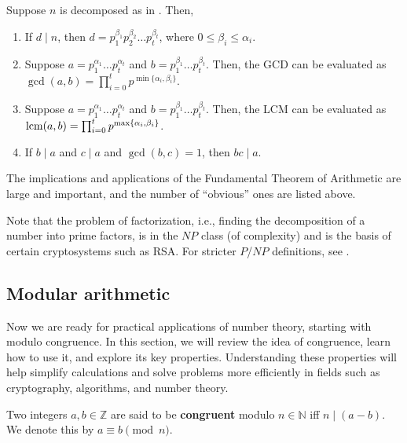 \documentclass[../lecture-notes-148x210.tex]{subfiles}
\begin{document}
\begin{corollary}
    Suppose $n$ is decomposed as in . Then,

    \begin{enumerate}
        \item If $d \mid n$, then $d = p_{1}^{\beta_1}p_{2}^{\beta_2} \dots p_{t}^{\beta_t}$, where $0 \leq \beta_i \leq \alpha_i$.
        \item Suppose $a = p_{1}^{\alpha_1} \dots p_{t}^{\alpha_t}$ and $b = p_{1}^{\beta_1} \dots p_{t}^{\beta_t}$. Then, the GCD can be evaluated as $\gcd(a, b) = \prod_{i=0}^{t}p^{\min\{\alpha_i, \beta_i\}}$.
        \item Suppose $a = p_{1}^{\alpha_1} \dots p_{t}^{\alpha_t}$ and $b = p_{1}^{\beta_1} \dots p_{t}^{\beta_t}$. Then, the LCM can be evaluated as $\text{lcm}(a, b) = \prod_{i=0}^{t}p^{\max\{\alpha_i, \beta_i\}}$.
        \item If $b \mid a$ and $c \mid a$ and $\gcd(b, c) = 1$, then $bc \mid a$.
    \end{enumerate}
\end{corollary}

The implications and applications of the Fundamental Theorem of Arithmetic are
large and important, and the number of ``obvious'' ones are listed above. 
\begin{remark}
    Note that the problem of factorization, i.e., finding the decomposition of a
number into prime factors, is in the $NP$ class (of complexity) and is the basis
of certain cryptosystems such as RSA. For stricter $P$/$NP$ definitions, see 
.
\end{remark}

\subsection{Modular arithmetic}

Now we are ready for practical applications of number theory, starting with modulo congruence.
In this section, we will review the idea of congruence, learn how to use it, and explore
its key properties. Understanding these properties will help simplify calculations and solve 
problems more efficiently in fields such as cryptography, algorithms, and number theory.

\begin{definition}
    Two integers $a, b \in \mathbb{Z}$ are said to be \textbf{congruent} modulo
    $n \in \mathbb{N}$ iff $n \mid (a-b)$. We denote this by $a \equiv b
    \pmod{n}$.
\end{definition}
\end{document}
